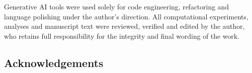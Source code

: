 Generative AI tools were used solely for code engineering, refactoring and
language polishing under the author's direction. All computational
experiments, analyses and manuscript text were reviewed, verified and edited
by the author, who retains full responsibility for the integrity and final
wording of the work.

\ifdefined\ANONYMOUS\else
\ifdefined\DRAFTTODO
\subsection*{Acknowledgements}

\fi
\fi
